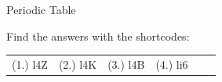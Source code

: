 \begin{eocexercises}{ Periodic Table}
\begin{enumerate}[noitemsep, label=\textbf{\arabic*}. ]
\end{enumerate}
  \label{4e3d8e3d8992782b4e5d6fd958df32f9**end}
\par {} Find the answers with the shortcodes:
 \par \begin{tabular}[h]{cccccc}
 (1.) l4Z  &  (2.) l4K  &  (3.) l4B  &  (4.) li6  & \end{tabular}
\end{eocexercises}
